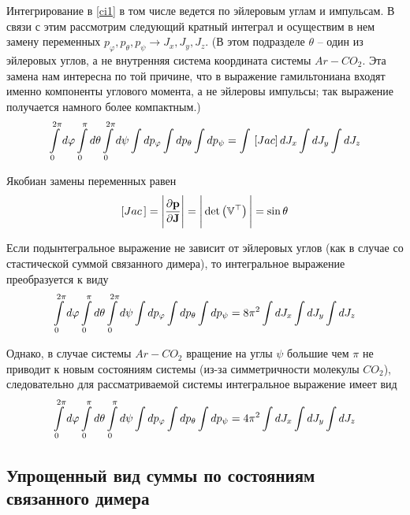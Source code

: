 Интегрирование в \eqref{ci1} в том числе ведется по эйлеровым углам и импульсам. В связи с этим рассмотрим следующий кратный интеграл и осуществим в нем замену переменных $p_\varphi, p_\theta, p_\psi \longrightarrow J_x, J_y, J_z$. (В этом подразделе $\theta$ -- один из эйлеровых углов, а не внутренняя система координата системы $Ar-CO_2$. Эта замена нам интересна по той причине, что в выражение гамильтониана входят именно компоненты углового момента, а не эйлеровы импульсы; так выражение получается намного более компактным.)
\vverh
\begin{gather}
	\int\limits_{0}^{2 \pi} d \varphi \int\limits_{0}^{\pi} d \theta \int\limits_{0}^{2 \pi} d \psi \int d p_\varphi \int d p_\theta \int d p_\psi = \int \, \left[ Jac \right] d J_x \int d J_y \int d J_z \notag
\end{gather}

Якобиан замены переменных равен
\vverh
\begin{gather}
	\left[ Jac \, \right] = \Bigg{|} \frac{\partial \mathbf{p}}{\partial \mathbf{J}} \Bigg{|} = \Bigg{|} \det \left( \mathbb{V}^\top \right) \Bigg{|} = \sin \theta \notag
\end{gather}

Если подынтегральное выражение не зависит от эйлеровых углов (как в случае со стастической суммой связанного димера), то интегральное выражение преобразуется к виду
\vverh
\begin{gather}
	\int\limits_{0}^{2 \pi} d \varphi \int\limits_{0}^{\pi} d \theta \int\limits_{0}^{2 \pi} d \psi \int d p_\varphi \int d p_\theta \int d p_\psi = 8 \pi^2 \int d J_x \int d J_y \int d J_z \notag 
\end{gather}

Однако, в случае системы $Ar-CO_2$ вращение на углы $\psi$ большие чем $\pi$ не приводит к новым состояниям системы (из-за симметричности молекулы $CO_2$), следовательно для рассматриваемой системы интегральное выражение имеет вид
\vverh
\begin{gather}
	\int\limits_{0}^{2 \pi} d \varphi \int\limits_{0}^{\pi} d \theta \int\limits_{0}^{\pi} d \psi \int d p_\varphi \int d p_\theta \int d p_\psi = 4 \pi^2 \int d J_x \int d J_y \int d J_z \notag 
\end{gather}

\subsection{Упрощенный вид суммы по состояниям связанного димера}

